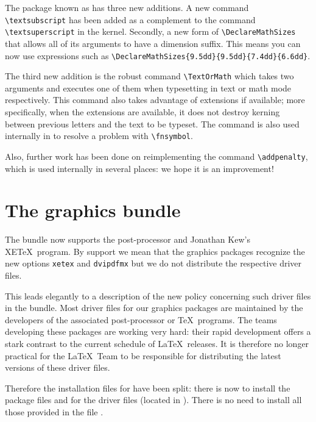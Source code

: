 \documentclass
    [lw35fonts]    %
     {ltnews}[2004/02/28]
\begin{document}
The package known as  has three new additions. A new
command \verb|\textsubscript| has been added as a complement to the
command \verb|\textsuperscript| in the kernel.  Secondly, a new form of
\verb|\DeclareMathSizes| that allows all of its arguments to have a
dimension suffix.  This means you can now use expressions such as
\verb|\DeclareMathSizes{9.5dd}{9.5dd}{7.4dd}{6.6dd}|.

The third new
addition is the robust command \verb|\TextOrMath| which takes two
arguments and executes one of them when typesetting in text or math
mode respectively. This command also takes advantage of \eTeX{}
extensions if available; more specifically,
when the \eTeX{} extensions are available, it does not
destroy kerning between previous letters and the text to be typeset.
The command is also used
internally in  to resolve a problem with
\verb|\fnsymbol|.

Also, further work has been done on reimplementing
the command \verb|\addpenalty|, which is used internally in several
places: we hope it is an improvement!

\section{The graphics bundle}

The  bundle now supports the
 post-processor and Jonathan Kew's XE\TeX\
program. By support we mean that the graphics packages recognize the
new options \texttt{xetex} and \texttt{dvipdfmx} but we do not
distribute the respective driver files.

This leads elegantly to a description of the
new policy concerning such driver files in the  bundle.
Most driver files for our graphics packages are maintained by the
developers of the associated post-processor or \TeX\ programs.
The teams developing these packages are working very hard: their rapid
development offers a stark contrast to the current schedule of \LaTeX\
releases.  It is therefore no longer practical
for the \LaTeX\ Team to be responsible for distributing the
latest versions of these driver files.

Therefore the installation files for  have been
split: there is now  to install the package files and
\file{graphics-drivers.ins} for the driver files (located in
).
There is no need
to install all those provided in the file \file{drivers.dtx}.
\end{document}
